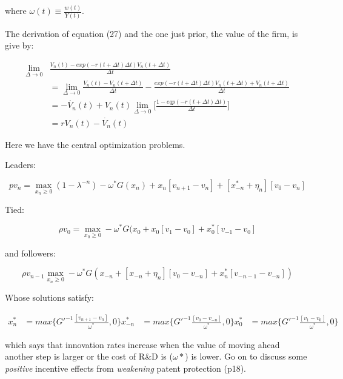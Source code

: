 \documentclass[11pt]{article}
\begin{document}
  where $\omega(t) \equiv \frac{w(t)}{Y(t)}$.

  The derivation of equation (27) and the one just prior, the value of the firm, is give by:

  \begin{align} \label{eq:firm_value}
    \lim_{\Delta \rightarrow 0}& \frac{V_n(t) - exp(-r(t + \Delta t)\Delta t)V_n(t + \Delta t)}{\Delta t}\\
    &= \lim_{\Delta \rightarrow 0} \frac{V_n(t) - V_n(t + \Delta t)}{\Delta t} - \frac{exp(-r(t + \Delta t)\Delta t)V_n(t + \Delta t) + V_n(t + \Delta t)}{\Delta t}\\
    &= -\dot{V_n}(t) + V_n(t) \lim_{\Delta \rightarrow 0}\Big[\frac{1 - eqp(-r(t + \Delta t)\Delta t)}{\Delta t}]\\
    &= rV_n(t) - \dot{V_n}(t)
  \end{align}

  Here we have the central optimization problems.

  Leaders:

  \begin{equation} \label{eq:rvf_leader}  %
    pv_n = \max_{x_n \geq 0} (1 - \lambda^{-n}) - \omega^*G(x_n) + x_n[v_{n+1} - v_n] + [x_{-n}^* + \eta_n][v_0 - v_n]
  \end{equation}

  Tied:

  \begin{equation} \label{eq:rvf_tied}
    \rho v_0 = \max_{x_0 \geq 0} -\omega^*G(x_{0} + x_{0}[v_1 - v_0] + x_0^*[v_{-1} - v_0]
  \end{equation}

  and followers:

  \begin{equation} \label{eq:rvf_follower}
    \rho v_{n-1} \max_{x_n \geq 0} -\omega^*G(x_{-n} + [x_{-n} + \eta_n][v_0 - v_{-n}] + x_n^*[v_{-n-1} - v_{-n}])
    \end{equation}

  Whose solutions satisfy:

  \begin{align} \label{eq:ss_rd_policies}
    x_n^*    &= max \big\{G'^{-1}\frac{[v_{n+1} - v_n]}{\omega^*}   ,0\}  
    x_{-n}^* &= max \big\{G'^{-1}\frac{[v_0  - v_{-n}]}{\omega^*}   ,0\}
    x_0^*    &= max \big\{G'^{-1}\frac{[v_1     - v_0]}{\omega^*}   ,0\}
  \end{align}
  
  which says that innovation rates increase when the value of moving ahead another step is larger or the cost of R\&D is ($\omega*$) is lower.  Go on to discuss some \emph{positive} incentive effects from \emph{weakening} patent protection (p18).
\end{document}
